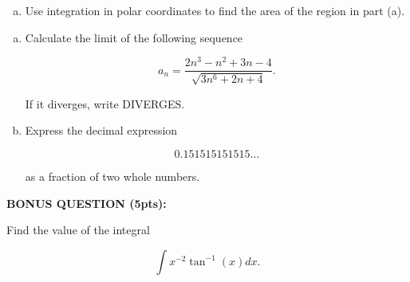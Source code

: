 \documentclass[11pt]{exam}
\theoremstyle{definition}
\begin{document}
\begin{questions}
\begin{enumerate}[(a)]
\vspace{4in}

\item
Use integration in polar coordinates to find the area of the region in part (a).

\end{enumerate}

\newpage
\question[10]\mbox{} 

\begin{enumerate}[(a)]
\item

Calculate the limit of the following sequence

$$a_n = \frac{2n^3-n^2+3n-4}{\sqrt{3n^6 + 2n + 4}}.$$

If it diverges, write DIVERGES.

\vspace{3.5in}

\item

Express the decimal expression

$$0.151515151515\dots$$

as a fraction of two whole numbers.

\end{enumerate}


\newpage
\textbf{BONUS QUESTION (5pts):}

Find the value of the integral

$$\int x^{-2}\tan^{-1}(x)dx.$$


\end{questions}
\end{document}
